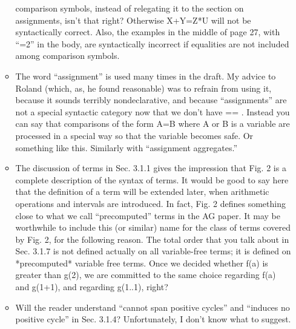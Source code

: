 \begin{itemize}
\begin{itemize}
  comparison symbols, instead of relegating it to the section on assignments,
  isn't that right? Otherwise X+Y=Z*U will not be syntactically correct. 
  Also, the examples in the middle of page 27, with “=2” in the body, are
  syntactically incorrect if equalities are not included among comparison
  symbols.
 \item
  The word ``assignment'' is used many times in the draft.  My advice to Roland
  (which, as, he found reasonable) was to refrain from using it, because it
  sounds terribly nondeclarative, and because “assignments” are not a special
  syntactic category now that we don't have == . Instead you can say that
  comparisons of the form A=B where A or B is a variable are processed in a
  special way so that the variable becomes safe.  Or something like this. 
  Similarly with ``assignment aggregates.''
 \item
  The discussion of terms in Sec. 3.1.1 gives the impression that Fig. 2 is a
  complete description of the syntax of terms.  It would be good to say here
  that the definition of a term will be extended later, when arithmetic
  operations and intervals are introduced.  In fact, Fig. 2 defines something
  close to what we call “precomputed” terms in the AG paper.  It may be
  worthwhile to include this (or similar) name for the class of terms covered
  by Fig. 2, for the following reason.  The total order that you talk about
  in Sec. 3.1.7 is not defined actually on all variable-free terms; it is
  defined on *precomputed* variable free terms.  Once we decided whether f(a)
  is greater than g(2), we are committed to the same choice regarding f(a)
  and g(1+1), and regarding g(1..1), right?
 \item
  Will the reader understand “cannot span positive cycles” and “induces no
  positive cycle” in Sec. 3.1.4?  Unfortunately, I don't know what to
  suggest.
  
\end{itemize}
\end{itemize}

